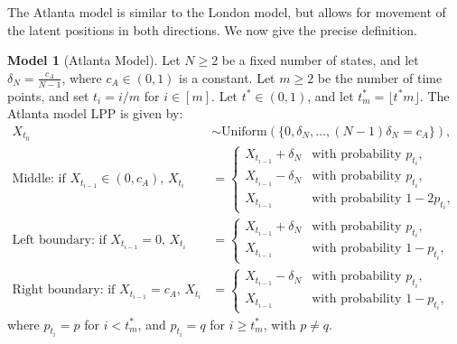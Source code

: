 \documentclass[12pt]{article}
\theoremstyle{definition}
\newtheorem{model}{Model} %
\begin{document}
The Atlanta model is similar to the London model, but allows for movement of the latent positions in both directions. We now give the precise definition.

\begin{model}[Atlanta Model]\label{mod:Atlanta} 
Let $N \geq 2$ be a fixed number of states, and let $\delta_N = \frac{c_A}{N-1}$, where $c_A \in (0,1)$ is a constant. Let $m \geq 2$ be the number of time points, and set $t_i = i/m$ for $i \in [m]$. Let $t^* \in (0,1)$, and let $t^*_m = \lfloor t^*m \rfloor$. The Atlanta model LPP is given by:
\begin{align*}
X_{t_0} &\sim \mathrm{Uniform}(\{0,\delta_N,\ldots,(N-1)\delta_N=c_A\}), \\
\text{Middle: if $X_{t_{i-1}} \in (0, c_A)$, } X_{t_i} &=\begin{cases}
X_{t_{i-1}} + \delta_N & \text{with probability $p_{t_i}$}, \\
X_{t_{i-1}} - \delta_N & \text{with probability $p_{t_i}$}, \\
X_{t_{i-1}} & \text{with probability $1 - 2p_{t_i}$},
\end{cases} \\
\text{Left boundary: if $X_{t_{i-1}} = 0$, } X_{t_i} &=\begin{cases}
X_{t_{i-1}} + \delta_N & \text{with probability $p_{t_i}$}, \\
X_{t_{i-1}} & \text{with probability $1 - p_{t_i}$},
\end{cases} \\
\text{Right boundary: if $X_{t_{i-1}} = c_A$, } X_{t_i} &=\begin{cases}
X_{t_{i-1}} - \delta_N & \text{with probability $p_{t_i}$}, \\
X_{t_{i-1}} & \text{with probability $1 - p_{t_i}$},
\end{cases}
\end{align*}
where $p_{t_i} = p$ for $i < t^*_m$, and $p_{t_i} = q$ for $i \geq t^*_m$, with $p \neq q$.
\end{model}
\end{document}
